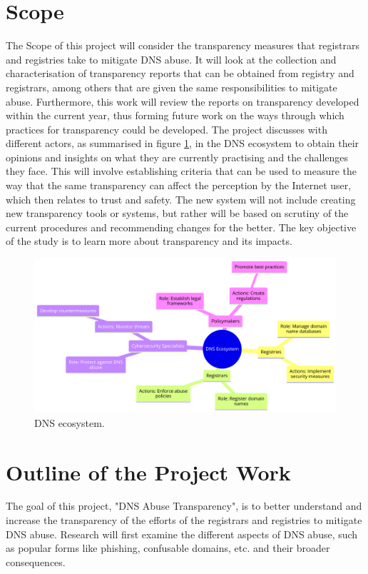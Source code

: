 \section{Scope}	
The Scope of this project will consider the transparency measures that registrars and registries take to mitigate DNS abuse. It will look at the collection and characterisation of transparency reports that can be obtained from registry and registrars, among others that are given the same responsibilities to mitigate abuse. Furthermore, this work will review the reports on transparency developed within the current year, thus forming future work on the ways through which practices for transparency could be developed. The project discusses with different actors, as summarised in figure \ref{fig:dnsintrointro}, in the DNS ecosystem to obtain their opinions and insights on what they are currently practising and the challenges they face. This will involve establishing criteria that can be used to measure the way that the same transparency can affect the perception by the Internet user, which then relates to trust and safety. The new system will not include creating new transparency tools or systems, but rather will be based on scrutiny of the current procedures and recommending changes for the better. The key objective of the study is to learn more about transparency and its impacts.  

\begin{figure}[H]
    \centering
    \includegraphics[width=0.7\linewidth]{introduction/diagram (8).png}
    \caption{ DNS ecosystem.}
    \label{fig:dnsintrointro}
\end{figure}

\section{ Outline of the Project Work} 

The goal of this project, "DNS Abuse Transparency", is to better understand and increase the transparency of the efforts of the registrars and registries to mitigate DNS abuse. Research will first examine the different aspects of DNS abuse, such as popular forms like phishing, confusable domains, etc. and their broader consequences. 

